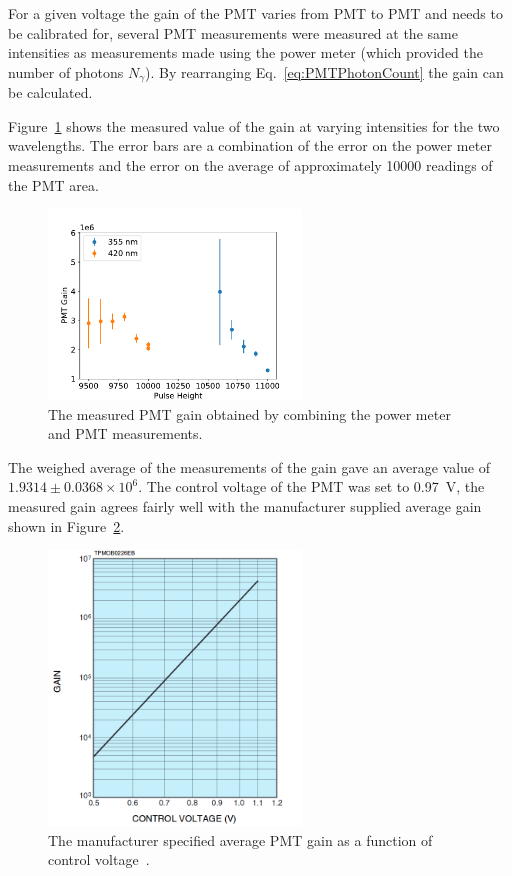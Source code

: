 \documentclass[11pt, a4paper, oneside ]{article}
\begin{document}
For a given voltage the gain of the PMT varies from PMT to PMT and needs to be calibrated for, several PMT measurements were measured at the same intensities as measurements made using the power meter (which provided the number of photons $N_\gamma$). By rearranging Eq.~\ref{eq:PMTPhotonCount} the gain can be calculated. 

Figure~\ref{fig:measuredGain} shows the measured value of the gain at varying intensities for the two wavelengths. The error bars are a combination of the error on the power meter measurements and the error on the average of approximately 10000 readings of the PMT area.

\begin{figure}[H]
    \centering
    \includegraphics[width=0.6\textwidth]{figures/PMTGain.pdf}
    \caption{The measured PMT gain obtained by combining the power meter and PMT measurements.}
    \label{fig:measuredGain}
\end{figure}

The weighed average of the measurements of the gain gave an average value of \newline $1.9314 \pm 0.0368 \times 10^{6}$. The control voltage of the PMT was set to \SI{0.97}{V}, the measured gain agrees fairly well with the manufacturer supplied average gain shown in Figure~\ref{fig:PMTGainSpec}.

\begin{figure}[H]
    \centering
    \includegraphics[width=0.6\textwidth]{figures/PMTGainSpec.png}
    \caption{The manufacturer specified average PMT gain as a function of control voltage~\cite{PMTDataSheet}.}
    \label{fig:PMTGainSpec}
\end{figure}
\end{document}
